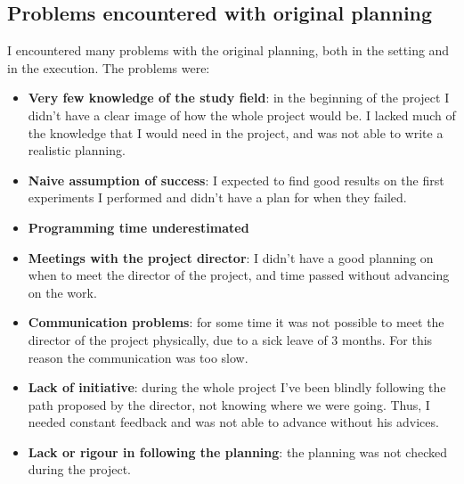 \documentclass{article}
\begin{document}

    \subsection{Problems encountered with original planning}
    I encountered many problems with the original planning, both in the
    setting and in the execution. The problems were:
    \begin{itemize}
        \item \textbf{Very few knowledge of the study field}: in the beginning of the project I didn't have a clear image of how the whole project
        would be. I lacked much of the knowledge that I would need in the
        project, and was not able to write a realistic planning.
        \item \textbf{Naive assumption of success}: I expected to find good
        results on the first experiments I performed and didn't have a plan for
        when they failed.
        \item \textbf{Programming time underestimated}
        \item \textbf{Meetings with the project director}: I didn't have a good
        planning on when to meet the director of the project, and time passed
        without advancing on the work.
        \item \textbf{Communication problems}: for some time it was not possible
        to meet the director of the project physically, due to a sick leave of
        3 months. For this reason the communication was too slow.
        \item \textbf{Lack of initiative}: during the whole project I've been
        blindly following the path proposed by the director, not knowing where
        we were going. Thus, I needed constant feedback and was not able to
        advance without his advices.
        \item \textbf{Lack or rigour in following the planning}:
        the planning was not checked during the project.
    \end{itemize}
\end{document}
